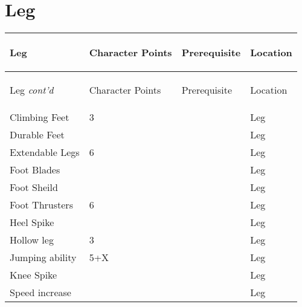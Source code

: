 \documentclass[twoside]{book}
\begin{document}
\begin{multicols}{2}
    


\hspace{-2ex}
\vspace{1ex}


    


\hspace{-2ex}
\vspace{1ex}


    
\end{multicols}
  
    

\section{Leg}
    
\begin{longtable}{p{1.25in}p{2em}ll} 
  Leg& \begin{turn}{70}{Character Points}\end{turn}
          & \begin{turn}{70}{Prerequisite}\end{turn}
          & \begin{turn}{70}{Location}\end{turn}
          \\
  \hline
  \hline
  \endfirsthead
  Leg \textit{cont'd}
        & \begin{turn}{70}{Character Points}\end{turn}
          & \begin{turn}{70}{Prerequisite}\end{turn}
          & \begin{turn}{70}{Location}\end{turn}
           \\
  \hline
  \endhead
\raggedright Climbing Feet&3&&Leg\tabularnewline
      \raggedright Durable Feet&&&Leg\tabularnewline
      \raggedright Extendable Legs&6&&Leg\tabularnewline
      \raggedright Foot Blades&&&Leg\tabularnewline
      \raggedright Foot Sheild&&&Leg\tabularnewline
      \raggedright Foot Thrusters&6&&Leg\tabularnewline
      \raggedright Heel Spike&&&Leg\tabularnewline
      \raggedright Hollow leg&3&&Leg\tabularnewline
      \raggedright Jumping ability&5+X&&Leg\tabularnewline
      \raggedright Knee Spike&&&Leg\tabularnewline
      \raggedright Speed increase&&&Leg\tabularnewline
      
\end{longtable}
    
\end{document}
